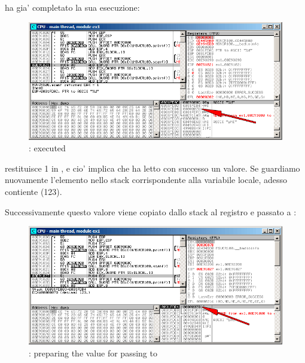 \clearpage
\scanf ha gia' completato la sua esecuzione:

\begin{figure}[H]
\centering
\includegraphics[scale=\FigScale]{patterns/04_scanf/1_simple/ex1_olly_3.png}
\caption{\olly: \scanf executed}
\label{fig:scanf_ex1_olly_3}
\end{figure}

\scanf restituisce 1 in \EAX, e cio' implica che ha letto con successo un valore.
Se guardiamo nuovamente l'elemento nello stack corrispondente alla variabile locale, adesso contiente  (123).

\clearpage

Successivamente questo valore viene copiato dallo stack al registro \ECX e passato a \printf:

\begin{figure}[H]
\centering
\includegraphics[scale=\FigScale]{patterns/04_scanf/1_simple/ex1_olly_4.png}
\caption{\olly: preparing the value for passing to \printf}
\label{fig:scanf_ex1_olly_4}
\end{figure}

